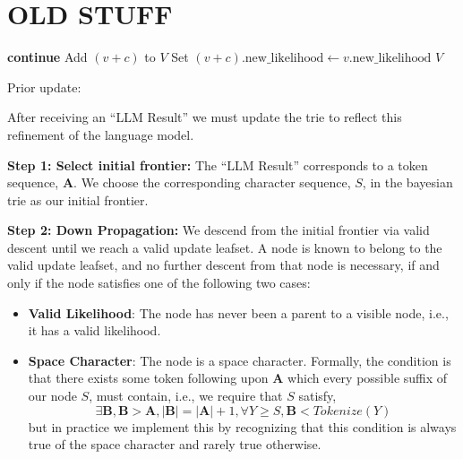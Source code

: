 \section{OLD STUFF}
\begin{algorithm}[H]
\caption{Complete Visible Trie}
\label{alg:complete-visible-trie}
\begin{algorithmic}[1]
        \State \textbf{continue} 
    \EndIf
            \State Add $(v + c)$ to $V$
            \State Set $(v + c).\text{new\_likelihood} \gets v.\text{new\_likelihood}$
        \EndIf
    \EndFor
\EndFor
\Return $V$
\end{algorithmic}
\end{algorithm}




Prior update:
\label{sec:prior-update}

After receiving an ``LLM Result'' we must update the trie to reflect this refinement of
the language model.

\textbf{Step 1: Select initial frontier:}
The ``LLM Result'' corresponds to a token sequence, $\mathbf{A}$.
We choose the corresponding character sequence, $S$, in the bayesian trie as our initial frontier.

\textbf{Step 2: Down Propagation:}
We descend from the initial frontier via valid descent until we reach a valid update leafset.
A node is known to belong to the valid update leafset, and no further descent from that
node is necessary, if and only if the node satisfies one of the following two cases:
\begin{itemize}
    \item \textbf{Valid Likelihood}: The node has never been a parent to a visible node, i.e., it has a valid likelihood.
    \item \textbf{Space Character}: The node is a space character. Formally, the condition is that there exists
    some token following upon $\mathbf{A}$ which every possible suffix of our node $S$, must contain, i.e.,
    we require that $S$ satisfy,
    $$
    \exists \mathbf{B}, \mathbf{B}>\mathbf{A}, |\mathbf{B}|=|\mathbf{A}|+1, \forall Y \geq S, \mathbf{B} < Tokenize(Y)
    $$
    but in practice we implement this by recognizing that this condition is always true of the space
    character and rarely true otherwise.
\end{itemize}

